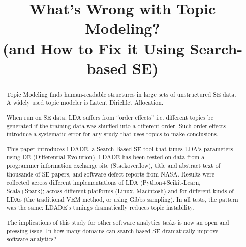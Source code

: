 \documentclass[10pt,conference]{IEEEtran}
\theoremstyle{break}
\begin{document}
\pagestyle{plain}

\title{\textbf{What's Wrong with
Topic Modeling?\\ (and How to Fix it Using Search-based SE)}}


\author{
\and
{}
\and
{}
}

\maketitle


\begin{abstract}
  Topic Modeling finds
  human-readable structures in large sets of unstructured SE data.
  A widely used topic modeler is Latent Dirichlet Allocation.

 When run on SE data, LDA suffers
 from ``order effects'' i.e. 
 different topics be generated if the training data was shuffled into a different order.
Such order effects introduce a systematic error for any study that uses
topics to make  conclusions.

This paper introduces LDADE, a 
Search-Based SE tool that tunes LDA's parameters using DE 
(Differential Evolution). 
LDADE has  been tested on  data from a programmer
information exchange site (Stackoverflow), title and abstract text of thousands
of SE papers, and software defect reports from NASA.  Results were collected
across different implementations of LDA (Python+Scikit-Learn, Scala+Spark); across
different platforms (Linux, Macintosh) and for different kinds of LDAs (the
traditional VEM method, or using Gibbs sampling). In all tests, the pattern was
the same: LDADE's tunings dramatically reduces topic instability.
  
The implications of this study for other software analytics tasks is now an open
and pressing issue. 
In how many domains can search-based SE dramatically improve software analytics?

\end{abstract}
\end{document}
